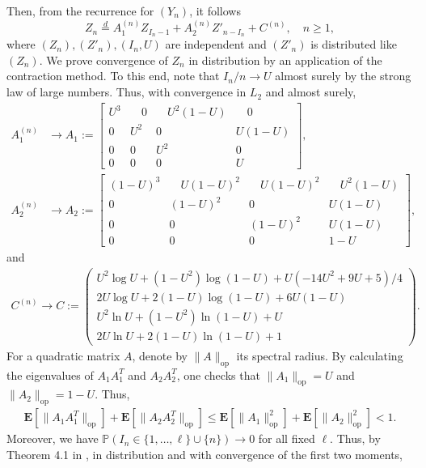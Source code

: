 \documentclass{amsart}       %
\newcommand{\E}[1]{\ensuremath{\mathbf{E} \left[#1 \right]}}
\newcommand{\Prob}[1]{\ensuremath{\mathbb{P} \left(#1 \right)}}
\begin{document}
Then, from the recurrence for $(Y_n)$, it follows
\begin{equation*}
Z_n\stackrel{d}{=}A_1^{(n)}Z_{I_n-1}+A_2^{(n)}Z'_{n-I_n}+C^{(n)}, \quad n \geq 1,
\end{equation*}
where $(Z_n), (Z'_n), (I_n, U)$ are independent and $(Z'_n)$ is distributed like $(Z_n)$. We prove convergence of $Z_n$ in distribution by an application of the contraction method. To this end, note that $I_n/n  \to U$ almost surely by the strong law of large numbers. Thus, with convergence in $L_2$ and almost surely,
\begin{align*} A_1^{(n)}& \to A_1:=\left[\begin{array}{cccc} U^3 &\quad 0&\quad U^2(1-U)&\quad 0 \\0 & U^2& 0&
U(1-U)\\0 & 0& U^2& 0\\0 & 0& 0&U
\end{array}\right],\\
A_2^{(n)}& \to A_2:=\left[\begin{array}{cccc}
(1-U)^3 &\quad U(1-U)^2&\quad U(1-U)^2&\quad U^2(1-U)\\ 0 & (1-U)^2&
0& U(1-U)\\0 & 0& (1-U)^2& U(1-U)\\0 & 0& 0& 1-U
\end{array}\right],\end{align*}
and
 \begin{align*} 
 C^{(n)} \to C :=\left(\begin{array}{cccc}U^2\log{U}+(1-U^2)\log{(1-U)}+U(-14U^2 + 9U + 5)/4 \\2U\log{U}+2(1-U)\log(1-U)+6U(1-U)\\ U^2\ln{U}+(1-U^2)\ln(1-U)+U \\
 2U\ln{U}+2(1-U)\ln{(1-U)} + 1\end{array}\right).
 \end{align*}
For a quadratic matrix $A$, denote by $\|A\|_{\text{op}}$ its spectral radius.
By calculating the eigenvalues of $A_1 A_1^T$ and $A_2 A_2^T$, one checks that $\|A_1\|_{\text{op}} = U$ and $\|A_2\|_{\text{op}} = 1-U$. Thus,
\begin{align*}
\E{\|A_1 A_1^T\|_{\text{op}}}+\E{\|A_2 A_2^T\|_{\text{op}}} \leq \E{\|A_1\|^2_{\text{op}}}+\E{\|A_2\|^2_{\text{op}}} <1.
\end{align*}
Moreover, we have $\Prob{I_n \in \{1, \ldots, \ell  \} \cup \{n\}} \to 0$ for all fixed $\ell$.
Thus, by Theorem 4.1 in \cite{necontrn}, in distribution and with convergence of the first two moments,
\end{document}
